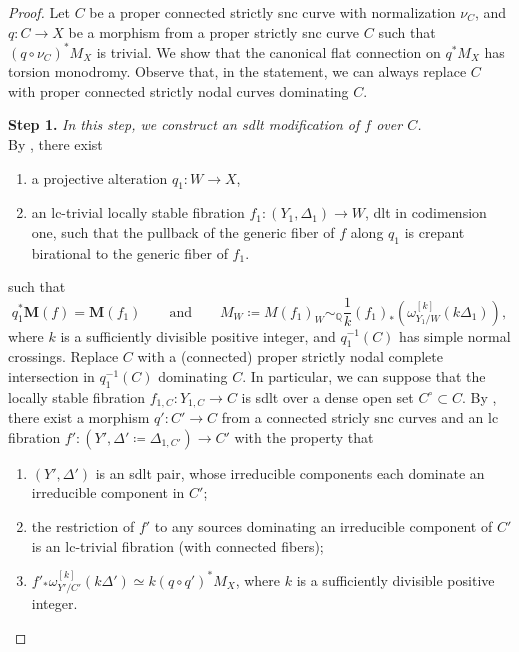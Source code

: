 \documentclass{amsart}
\theoremstyle{definition}
\theoremstyle{remark}
\def\bQ{\mathbb{Q}}
\newcommand\bfM{{\bf M}}
\def\bfM{\mathbf{M}}
\numberwithin{equation}{section}
\begin{document}
\begin{proof}
Let $C$ be a proper connected strictly snc curve with normalization $\nu_C$, and $q \colon C\to X$ be a morphism from a proper strictly snc curve $C$ such that $(q\circ \nu_C)^*M_X$ is trivial. We show that the canonical flat connection on $q^*M_X$ has torsion monodromy.
Observe that, in the statement, we can always replace $C$ with proper connected strictly nodal curves dominating $C$. 

\textbf{Step 1.} \emph{In this step, we construct an sdlt modification of $f$ over $C$.}\\
\noindent
By , there exist
\begin{enumerate}
\item a projective alteration $q_1 \colon W \to X$,
\item an lc-trivial locally stable fibration $f_1 \colon (Y_1, \Delta_1) \to W$, dlt in codimension one, such that the pullback of the generic fiber of $f$ along $q_1$ is crepant birational to the generic fiber of $f_1$.
\end{enumerate}
such that
\[
q_1^*\bfM(f)=\bfM(f_1) \qquad\mathrm{and}\qquad  M_{W}\coloneqq M(f_1)_{W} \sim_{\bQ} \frac{1}{k}(f_1)_* (\omega^{[k]}_{Y_1/W}(k\Delta_1)),
\] 
where $k$ is a sufficiently divisible positive integer, and $q_1^{-1}(C)$ has simple normal crossings. Replace $C$ with a (connected) proper strictly nodal complete intersection in $q_1^{-1}(C)$ dominating $C$. In particular, we can suppose that 
the locally stable fibration $f_{1,C} \colon Y_{1,C} \to C$ is sdlt over a dense open set $C^{\circ} \subset C$.
By , there exist a morphism $q' \colon C' \to C$ from a connected stricly snc curves and an lc fibration $f' \colon (Y', \Delta' \coloneqq \Delta_{1, C'}) \to C'$ with the property that 
\begin{enumerate}
\item $(Y', \Delta')$ is an sdlt pair, whose irreducible components each dominate an irreducible component in $C'$;
\item\label{item:connectednesssource_2} the restriction of $f'$ to any sources dominating an irreducible component of $C'$ is an lc-trivial fibration (with connected fibers);
\item\label{item:pushforward_2connectednesssource} $f'_* \omega^{[k]}_{Y'/C'}(k\Delta') \simeq k(q \circ q')^*M_X$,
where $k$ is a sufficiently divisible positive integer.
\end{enumerate} 


\end{proof}
\end{document}
